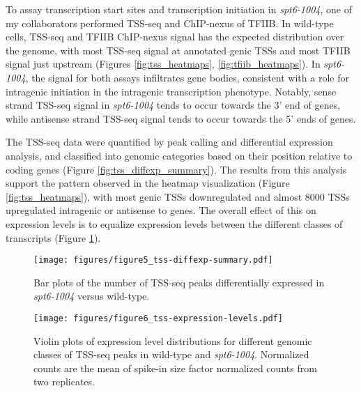 \documentclass[9pt, letterpaper]{article}
\begin{document}
To assay transcription start sites and transcription initiation in \textit{spt6-1004}, one of my collaborators performed TSS-seq and ChIP-nexus of TFIIB. In wild-type cells, TSS-seq and TFIIB ChIP-nexus signal has the expected distribution over the genome, with most TSS-seq signal at annotated genic TSSs and most TFIIB signal just upstream (Figures \ref{fig:tss_heatmaps}, \ref{fig:tfiib_heatmaps}). In \textit{spt6-1004}, the signal for both assays infiltrates gene bodies, consistent with a role for intragenic initiation in the intragenic transcription phenotype. Notably, sense strand TSS-seq signal in \textit{spt6-1004} tends to occur towards the 3' end of genes, while antisense strand TSS-seq signal tends to occur towards the 5' ends of genes.

The TSS-seq data were quantified by peak calling and differential expression analysis, and classified into genomic categories based on their position relative to coding genes (Figure \ref{fig:tss_diffexp_summary}). The results from this analysis support the pattern observed in the heatmap visualization (Figure \ref{fig:tss_heatmaps}), with most genic TSSs downregulated and almost 8000 TSSs upregulated intragenic or antisense to genes. The overall effect of this on expression levels is to equalize expression levels between the different classes of transcripts (Figure \ref{fig:tss_expression_levels}).

\vspace{1.75cm}

\begin{figure}[H]
    \centering
    \begin{minipage}[t]{8.5cm}
        \centering
        \texttt{[image: figures/figure5\_tss-diffexp-summary.pdf]}
        \caption{Bar plots of the number of TSS-seq peaks differentially expressed in \textit{spt6-1004} versus wild-type.}
        \label{fig:tss_diffexp_summary}
    \end{minipage}\hfill
    \begin{minipage}[t]{8.5cm}
        \centering
        \texttt{[image: figures/figure6\_tss-expression-levels.pdf]}
        \caption{Violin plots of expression level distributions for different genomic classes of TSS-seq peaks in wild-type and \textit{spt6-1004}. Normalized counts are the mean of spike-in size factor normalized counts from two replicates.}
        \label{fig:tss_expression_levels}
    \end{minipage}
\end{figure}
\end{document}
